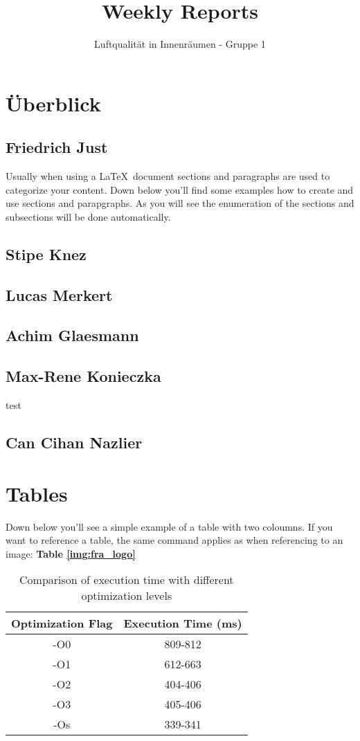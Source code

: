 \documentclass[]{article}
\title{Weekly Reports}
\author{Luftqualität in Innenräumen - Gruppe 1}
\begin{document}
\maketitle

\section{Überblick}


\subsection{Friedrich Just}
Usually when using a \LaTeX\ document sections and paragraphs are used to categorize your content. Down below you'll find some examples how to create and use sections and parapgraphs. As you will see the enumeration of the sections and subsections will be done automatically. 

\subsection{Stipe Knez}

\subsection{Lucas Merkert}

\subsection{Achim Glaesmann}

\subsection{Max-Rene Konieczka}
test
\subsection{Can Cihan Nazlier}


\section{Tables}
Down below you'll see a simple example of a table with two coloumns. If you want to reference a table, the same command applies as when referencing to an image: \textbf{Table \ref{img:fra_logo}}  
	
\begin{table}[h!]
	\centering
	\begin{tabular}{|c|c|}
		\hline
		{\textbf{Optimization Flag}}	&		{\textbf{Execution Time (ms)}} \\
		\hline
		-O0							&		809-812								\\
		\hline
		-O1							&		612-663								\\
		\hline
		-O2							&		404-406								\\
		\hline
		-O3							&		405-406								\\
		\hline
		-Os							&		339-341								\\
		\hline
	\end{tabular}
	\caption{Comparison of execution time with different optimization levels}
	\label{tab:exc_time}
\end{table}
\end{document}
